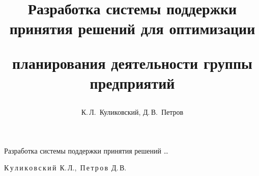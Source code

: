 


% 

%

% 





\renewcommand{\firstpage}{124}

\renewcommand{\lastpage}{132}
















\title{Разработка системы поддержки при\-нятия решений для оптимизации

планирования деятельности группы предприятий}%

{Разработка системы поддержки принятия решений \dots}%



\author{К.\,Л.~Куликовский, Д.\,В.~Петров}%

{К\,у\,л\,и\,к\,о\,в\,с\,к\,и\,й~К.\,Л.,\ П\,е\,т\,р\,о\,в~Д.\,В.}%













